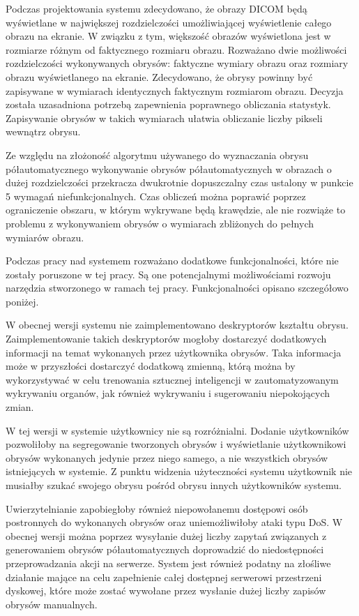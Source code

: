 \documentclass[a4paper,11pt,twoside,openright]{report}
\theoremstyle{definition}
\begin{document}
Podczas projektowania systemu zdecydowano, że obrazy DICOM będą wyświetlane w
największej rozdzielczości umożliwiającej wyświetlenie całego obrazu na ekranie.
W związku z tym, większość obrazów wyświetlona jest w rozmiarze różnym od
faktycznego rozmiaru obrazu. Rozważano dwie możliwości rozdzielczości wykonywanych
obrysów: faktyczne wymiary obrazu oraz rozmiary obrazu wyświetlanego na ekranie.
Zdecydowano, że obrysy powinny być zapisywane w wymiarach identycznych faktycznym
rozmiarom obrazu. Decyzja została uzasadniona potrzebą zapewnienia poprawnego
obliczania statystyk. Zapisywanie obrysów w takich wymiarach ułatwia obliczanie
liczby pikseli wewnątrz obrysu.

Ze względu na złożoność algorytmu używanego do wyznaczania obrysu półautomatycznego
wykonywanie obrysów półautomatycznych w obrazach o dużej rozdzielczości przekracza
dwukrotnie dopuszczalny czas ustalony w punkcie 5 wymagań niefunkcjonalnych. Czas
obliczeń można poprawić poprzez ograniczenie obszaru, w którym wykrywane będą
krawędzie, ale nie rozwiąże to problemu z wykonywaniem obrysów o wymiarach
zbliżonych do pełnych wymiarów obrazu.

Podczas pracy nad systemem rozważano dodatkowe funkcjonalności, które nie zostały
poruszone w tej pracy. Są one potencjalnymi możliwościami rozwoju narzędzia
stworzonego w ramach tej pracy. Funkcjonalności opisano szczegółowo poniżej.

W obecnej wersji systemu nie zaimplementowano deskryptorów kształtu obrysu.
Zaimplementowanie takich deskryptorów mogłoby dostarczyć dodatkowych informacji
na temat wykonanych przez użytkownika obrysów. Taka informacja może w przyszłości
dostarczyć dodatkową zmienną, którą można by wykorzystywać w celu trenowania
sztucznej inteligencji w zautomatyzowanym wykrywaniu organów, jak również wykrywaniu
i sugerowaniu niepokojących zmian.

W tej wersji w systemie użytkownicy nie są rozróżnialni. Dodanie użytkowników
pozwoliłoby na segregowanie tworzonych obrysów i wyświetlanie użytkownikowi
obrysów wykonanych jedynie przez niego samego, a nie wszystkich obrysów istniejących
w systemie. Z punktu widzenia użyteczności systemu użytkownik nie musiałby szukać
swojego obrysu pośród obrysu innych użytkowników systemu.

Uwierzytelnianie zapobiegłoby również niepowołanemu dostępowi osób postronnych
do wykonanych obrysów oraz uniemożliwiłoby ataki typu DoS. W obecnej wersji można
poprzez wysyłanie dużej liczby zapytań związanych z generowaniem obrysów półautomatycznych
doprowadzić do niedostępności przeprowadzania akcji na serwerze. System jest również
podatny na złośliwe działanie mające na celu zapełnienie całej dostępnej serwerowi
przestrzeni dyskowej, które może zostać wywołane przez wysłanie dużej liczby
zapisów obrysów manualnych.
\end{document}
